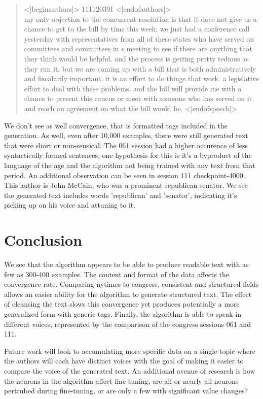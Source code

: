 \documentclass[11pt]{article}
\begin{document}
\begin{quote}
<|beginauthors|> 111120391 <|endofauthors|> \\
my only objection to the concurrent resolution is that it does not give us a chance to get to the bill by time this week. we just had a conference call yesterday with representatives from all of these states who have served on committees and committees in s meeting to see if there are anything that they think would be helpful. and the process is getting pretty tedious as they run it. but we are coming up with a bill that is both administratively and fiscalarily important. it is an effort to do things that work. a legislative effort to deal with these problems. and the bill will provide me with a chance to present this caucus or meet with someone who has served on it and reach an agreement on what the bill would be. <|endofspeech|>
\end{quote}

We don't see as well convergence, that is formatted tags included in the generation. As well, even after
10,000 examples, there were still generated text that were short or non-sensical. The 061 session had
a higher occurence of less syntactically formed sentences, one hypothesis for this is it's a byproduct 
of the language of the age and the algorithm not being trained with any text from that period. An
additional observation can be seen in session 111 checkpoint-4000. This author is John McCain, who
was a prominent republican senator. We see the generated text includes words 'republican' and 'senator',
indicating it's picking up on his voice and attuning to it.

\section{Conclusion}
\label{sec:org1222b19}

We see that the algorithm appears to be able to produce readable text with as few as 300-400 examples. 
The content and format of the data affects the convergence rate. Comparing nytimes to congress, 
consistent and structured fields allows an easier ability for the algorithm to generate structured text. 
The effect of cleansing the text slows this convergence yet produces potentially a more generalized form
 with generic tags. Finally, the algorithm is able to speak in different voices, represented by the 
comparison of the congress sessions 061 and 111.

Future work will look to accumulating more specific data on a single topic where the authors will
each have distinct voices with the goal of making it easier to compare the voice of the generated
text. An additional avenue of research is how the neurons in the algorithm affect fine-tuning,
are all or nearly all neurons pertrubed during fine-tuning, or are only a few with significant
value changes?
\end{document}
